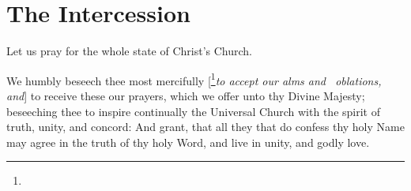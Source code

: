 \section{The Intercession}
\centerline{}
\centerline{Let us pray for the whole state of Christ's Church.} %
\smallskip
We humbly beseech thee most mercifully [\footnote{}\emph{to accept our alms and \grealtcross\ oblations, and}] to receive these our prayers, which we offer unto thy Divine Majesty; beseeching thee to inspire continually the Universal Church with the spirit of truth, unity, and concord: And grant, that all they that do confess thy holy Name may agree in the truth of thy holy Word, and live in unity, and godly love. %




